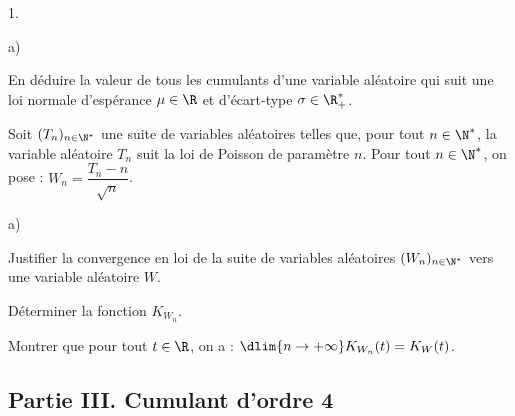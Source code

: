 \documentclass[11pt]{article}%
\begin{document}
\begin{noliste}{1.}
\begin{noliste}{a)}
  \item En déduire la valeur de tous les cumulants d'une variable
    aléatoire qui suit une loi normale d'espérance $\mu \in \R$ et
    d'écart-type $\sigma \in \R_+^*$.
  \end{noliste}
  
\item Soit $(T_n)_{n \in \N^*}$ une suite de variables aléatoires
  telles que, pour tout $n \in \N^*$, la variable aléatoire $T_n$ suit
  la loi de Poisson de paramètre $n$. Pour tout $n \in \N^*$, on pose
  : $W_n = \dfrac{T_n - n}{\sqrt{n}}$.
  \begin{noliste}{a)}
    \setlength{\itemsep}{2mm}
  \item Justifier la convergence en loi de la suite de variables
    aléatoires $(W_n)_{n \in \N^*}$ vers une variable aléatoire $W$.
    
  \item Déterminer la fonction $K_{W_n}$.
    
  \item Montrer que pour tout $t \in \R$, on a : $\dlim{n\to +\infty}
    K_{W_n}(t) = K_W(t)$.
  \end{noliste}
\end{noliste}


\subsection*{Partie III. Cumulant d'ordre 4}
\end{document}
